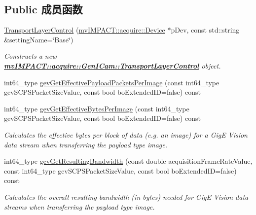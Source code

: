 \subsection*{Public 成员函数}
\begin{DoxyCompactItemize}
\item 
\hyperlink{classmv_i_m_p_a_c_t_1_1acquire_1_1_gen_i_cam_1_1_transport_layer_control_a6f52ec8de7c012f5866468676bbb9301}{Transport\+Layer\+Control} (\hyperlink{classmv_i_m_p_a_c_t_1_1acquire_1_1_device}{mv\+I\+M\+P\+A\+C\+T\+::acquire\+::\+Device} $\ast$p\+Dev, const std\+::string \&setting\+Name=\char`\"{}Base\char`\"{})
\begin{DoxyCompactList}\small\item\em Constructs a new {\bfseries \hyperlink{classmv_i_m_p_a_c_t_1_1acquire_1_1_gen_i_cam_1_1_transport_layer_control}{mv\+I\+M\+P\+A\+C\+T\+::acquire\+::\+Gen\+I\+Cam\+::\+Transport\+Layer\+Control}} object. \end{DoxyCompactList}\item 
int64\+\_\+type \hyperlink{classmv_i_m_p_a_c_t_1_1acquire_1_1_gen_i_cam_1_1_transport_layer_control_a47bb42df75288c90a2b762b486a67ff1}{gev\+Get\+Effective\+Payload\+Packets\+Per\+Image} (const int64\+\_\+type gev\+S\+C\+P\+S\+Packet\+Size\+Value, const bool bo\+Extended\+I\+D=false) const 
\item 
int64\+\_\+type \hyperlink{classmv_i_m_p_a_c_t_1_1acquire_1_1_gen_i_cam_1_1_transport_layer_control_a58d3a8850d06a412a5a3d826bc8d388b}{gev\+Get\+Effective\+Bytes\+Per\+Image} (const int64\+\_\+type gev\+S\+C\+P\+S\+Packet\+Size\+Value, const bool bo\+Extended\+I\+D=false) const 
\begin{DoxyCompactList}\small\item\em Calculates the effective bytes per block of data (e.\+g. an image) for a Gig\+E Vision data stream when transferring the payload type {\itshape image}. \end{DoxyCompactList}\item 
int64\+\_\+type \hyperlink{classmv_i_m_p_a_c_t_1_1acquire_1_1_gen_i_cam_1_1_transport_layer_control_a54d88be0d3d1f473c21e880ed4ffc997}{gev\+Get\+Resulting\+Bandwidth} (const double acquisition\+Frame\+Rate\+Value, const int64\+\_\+type gev\+S\+C\+P\+S\+Packet\+Size\+Value, const bool bo\+Extended\+I\+D=false) const 
\begin{DoxyCompactList}\small\item\em Calculates the overall resulting bandwidth (in bytes) needed for Gig\+E Vision data streams when transferring the payload type {\itshape image}. \end{DoxyCompactList}\item 

\end{DoxyCompactItemize}
